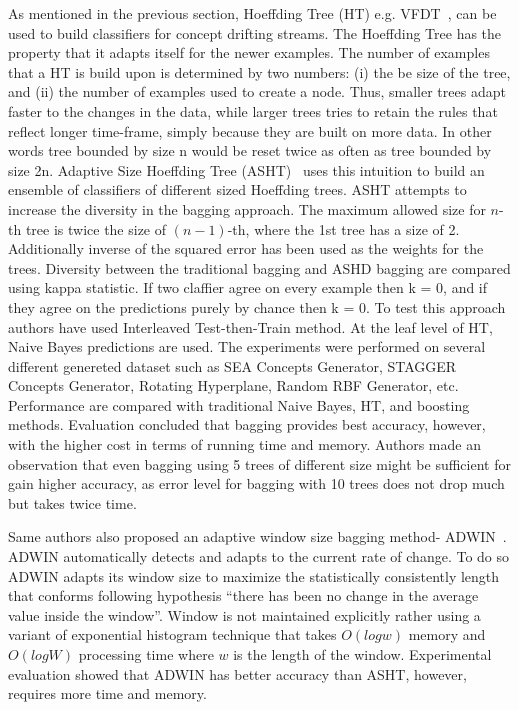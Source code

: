 As mentioned in the previous section, Hoeffding Tree (HT) e.g. VFDT~\cite{domingos00:vfdt}, can be used to build classifiers for concept drifting streams. The Hoeffding Tree has the property that it adapts itself for the newer examples. The number of examples that a HT is build upon is determined by two numbers: (i) the be size of the tree, and (ii) the number of examples used to create a node. Thus, smaller trees adapt faster to the changes in the data, while larger trees tries to retain the rules that reflect longer time-frame, simply because they are built on more data. In other words tree bounded by size n would be reset twice as often as tree bounded by size 2n. Adaptive Size Hoeffding Tree (ASHT)~\cite{bifet09:asht} uses this intuition to build an ensemble of classifiers of different sized Hoeffding trees. ASHT attempts to increase the diversity in the bagging approach. The maximum allowed size for $n$-th tree is twice the size of $(n-1)$-th, where the 1st tree has a size of 2. Additionally inverse of the squared error has been used as the weights for the trees. Diversity between the traditional bagging and ASHD bagging are compared using kappa statistic. If two claffier agree on every example then k = 0, and if they agree on the predictions purely by chance then k = 0. To test this approach authors have used Interleaved Test-then-Train method. At the leaf level of HT, Naive Bayes predictions are used. The experiments were performed on several different genereted dataset such as SEA Concepts Generator, STAGGER Concepts Generator, Rotating Hyperplane, Random RBF Generator, etc. Performance are compared with traditional Naive Bayes, HT, and boosting methods. Evaluation concluded that bagging provides best accuracy, however, with the higher cost in terms of running time and memory. Authors made an observation that even bagging using 5 trees of different size might be sufficient for gain higher accuracy, as error level for bagging with 10 trees does not drop much but takes twice time.

Same authors also proposed an adaptive window size bagging method- ADWIN~\cite{bifet09:asht}. ADWIN automatically detects and adapts to the current rate of change. To do so ADWIN adapts its window size to maximize the statistically consistently length that conforms following hypothesis ``there has been no change in the average value inside the window''. Window is not maintained explicitly rather using a variant of exponential histogram technique that takes $O(log w)$ memory and $O(log W)$ processing time where $w$ is the length of the window. Experimental evaluation showed that ADWIN has better accuracy than ASHT, however, requires more time and memory. 

